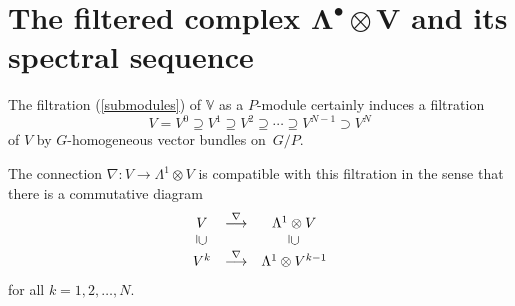 \documentclass[pdftex]{sigma}
\begin{document}
\section[The filtered complex $\Lambda^\bullet\otimes V$ and its spectral sequence]{The f\/iltered complex $\boldsymbol{\Lambda^\bullet\otimes V}$ and its spectral sequence}

The f\/iltration (\ref{submodules}) of ${\mathbb{V}}$ as a $P$-module certainly
induces a f\/iltration
\[
V=V^0\supseteq V^1\supseteq V^2\supseteq\cdots\supseteq V^{N-1}\supset V^N
\]
of $V$ by $G$-homogeneous vector bundles on~$G/P$.
\begin{theorem}\label{compatible} The connection
$\nabla:V\to\Lambda^1\otimes V$ is compatible with this filtration in the
sense that there is a commutative diagram
\[\begin{array}{ccc}V&\stackrel{\nabla}{\longrightarrow}&\Lambda^1\otimes V\\
\rule[.7pt]{.4pt}{6pt}\hspace*{.7pt}\cup
&&\rule[.7pt]{.4pt}{6pt}\hspace*{.7pt}\cup\\
V^k&\stackrel{\nabla}{\longrightarrow}&\Lambda^1\otimes V^{k-1}
\end{array}\]
for all $k=1,2,\ldots,N$.
\end{theorem}
\end{document}
